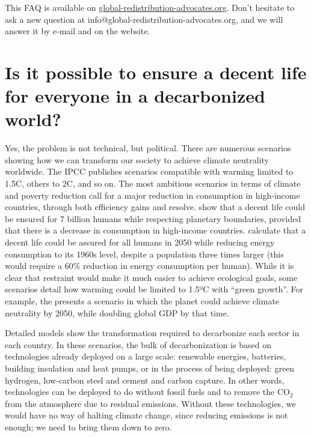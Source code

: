 \documentclass[a5paper,english,openany]{memoir}
\begin{document}
This FAQ is available on \href{http://global-redistribution-advocates.org/}{global-redistribution-advocates.org}. Don't hesitate to ask a new question at info@global-redistribution-advocates.org, and we will answer it by e-mail and on the website.

\section*{\normalsize Is it possible to ensure a decent life for everyone in a decarbonized %
world?}\label{q:decent}

Yes, the problem is not technical, but political. There are numerous scenarios showing how we can transform our society to achieve climate neutrality worldwide. The IPCC publishes scenarios compatible with warming limited to 1.5\textdegree{}C, others to 2\textdegree{}C, and so on. The most ambitious scenarios in terms of climate and poverty reduction call for a major reduction in consumption in high-income countries, through both efficiency gains and resolve. %
\cite{oneill_good_2018,hickel_is_2019} show that a decent life could be ensured for 7 billion humans while respecting planetary boundaries, provided that %
there is a decrease in consumption in high-income countries. \cite{millward-hopkins_providing_2020} calculate that a decent life could be assured for all humans in 2050 while reducing energy consumption to its 1960s level, despite a population three times larger (this would require a 60\% reduction in energy consumption per human). While it is clear that restraint %
would make it much easier to achieve ecological goals, some scenarios detail how warming could be limited to 1.5ºC with ``green growth''. For example, the \cite{international_energy_agency_net_2023} presents a scenario in which %
the planet could %
achieve climate neutrality by 2050, while doubling global GDP by that time. 

Detailed models show the transformation required to decarbonize %
each sector in each country. In these scenarios, the bulk of decarbonization %
is based on technologies already deployed on a large scale: renewable energies, batteries, building insulation and heat pumps, %
or in the process of being deployed: green hydrogen, low-carbon steel and cement and carbon capture. %
In other words, technologies can be deployed to do without fossil fuels and to remove the CO$_\text{2}$ from the atmosphere due to residual emissions. Without these technologies, we would have no way of halting climate change, since reducing emissions is not enough; we need to bring them down to zero. %
\end{document}
